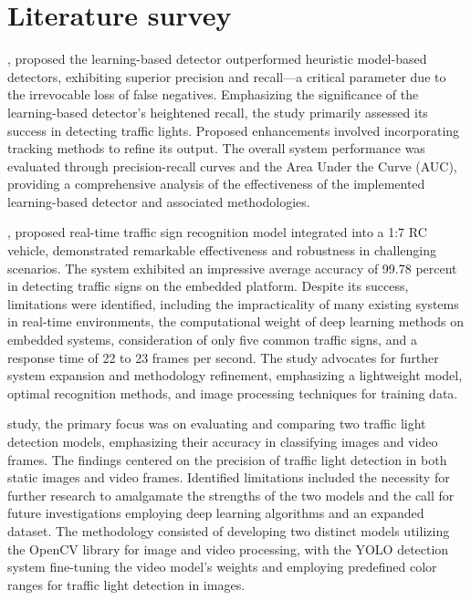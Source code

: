\documentclass[12 pt]{report}
\begin{document}
\section{Literature survey}
 {
  \hspace*{1cm}{\bfseries Mark P Philipsen}, proposed the learning-based detector outperformed heuristic model-based detectors, exhibiting superior precision and recall—a critical parameter due to the irrevocable loss of false negatives. Emphasizing the significance of the learning-based detector’s heightened recall, the study primarily assessed its success in detecting traffic lights. Proposed enhancements involved incorporating tracking methods to refine its output. The overall system performance was evaluated through precision-recall curves and the Area Under the Curve (AUC), providing a comprehensive analysis of the effectiveness of the implemented learning-based detector and associated methodologies.

  \hspace*{1cm}{\bfseries Trung-Hieu Nguyen’s}, proposed real-time traffic sign recognition model integrated into a 1:7 RC vehicle, demonstrated remarkable effectiveness and robustness in challenging scenarios. The system exhibited an impressive average accuracy of 99.78 percent in detecting traffic signs on the embedded platform. Despite its success, limitations were identified, including the impracticality of many existing systems in real-time environments, the computational weight of deep learning methods on embedded systems, consideration of only five common traffic signs, and a response time of 22 to 23 frames per second. The study advocates for further system expansion and methodology refinement, emphasizing a lightweight model, optimal recognition methods, and image processing techniques for training data.

  \hspace*{1cm}{\bfseries Noor Hussain Sarhan’s} study, the primary focus was on evaluating and comparing two traffic light detection models, emphasizing their accuracy in classifying images and video frames. The findings centered on the precision of traffic light detection in both static images and video frames. Identified limitations included the necessity for further research to amalgamate the strengths of the two models and the call for future investigations employing deep learning algorithms and an expanded dataset. The methodology consisted of developing two distinct models utilizing the OpenCV library for image and video processing, with the YOLO detection system fine-tuning the video model’s weights and employing predefined color ranges for traffic light detection in images.

}
\end{document}
